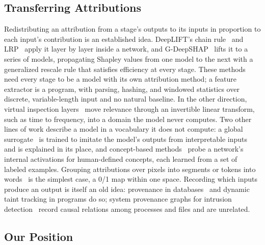 \subsection{Transferring Attributions}
\label{sec:XML:BgTransfer}

Redistributing an attribution from a stage's outputs to its inputs in proportion to each input's contribution is an
established idea. DeepLIFT's chain rule~\cite{shrikumar2017learning} and LRP~\cite{bach2015pixel} apply it layer by
layer inside a network, and G-DeepSHAP~\cite{chen2022explaining} lifts it to a series of models, propagating Shapley
values from one model to the next with a generalized rescale rule that satisfies efficiency at every stage. These
methods need every stage to be a model with its own attribution method; a feature extractor is a program, with
parsing, hashing, and windowed statistics over discrete, variable-length input and no natural baseline. In the other
direction, virtual inspection layers~\cite{vielhaben2024explainable} move relevance through an invertible linear
transform, such as time to frequency, into a domain the model never computes. Two other lines of work describe a model
in a vocabulary it does not compute: a global surrogate~\cite{craven1996extracting, frosst2017distilling} is trained to
imitate the model's outputs from interpretable inputs and is explained in its place, and concept-based
methods~\cite{bau2017network, kim2018interpretability} probe a network's internal activations for human-defined
concepts, each learned from a set of labeled examples. Grouping attributions over pixels into
segments or tokens into words~\cite{jullum2021groupshapley} is the simplest case, a 0/1 map within one space. Recording
which inputs produce an output is itself an old idea: provenance in databases~\cite{green2007provenance} and dynamic
taint tracking in programs do so; system provenance graphs for intrusion detection~\cite{milajerdi2019poirot,
cheng2024kairos} record causal relations among processes and files and are unrelated.

\subsection{Our Position}
\label{sec:XML:BgPosition}

